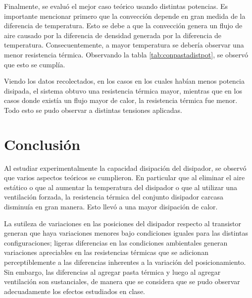 \documentclass{article}
\begin{document}
Finalmente, se evaluó el mejor caso teórico usando distintas potencias. Es importante mencionar primero que la convección depende en gran medida de la diferencia de temperatura. Esto se debe a que la convección genera un flujo de aire causado por la diferencia de densidad generada por la diferencia de temperatura. Consecuentemente, a mayor temperatura se debería observar una menor resistencia térmica. Observando la tabla \ref{tab:conpastadistpot}, se observó que esto se cumplía. \par
Viendo los datos recolectados, en los casos en los cuales habían menos potencia disipada, el sistema obtuvo una resistencia térmica mayor, mientras que en los casos donde existía un flujo mayor de calor, la resistencia térmica fue menor. Todo esto se pudo observar a distintas tensiones aplicadas.

\section{Conclusión}

Al estudiar experimentalmente la capacidad disipación del disipador, se observó que varios aspectos teóricos se cumplieron. En particular que al eliminar el aire estático o que al aumentar la temperatura del disipador o que al utilizar una ventilación forzada, la resistencia térmica del conjunto disipador carcasa disminuía en gran manera. Esto llevó a una mayor disipación de calor.

La sutileza de variaciones en las posiciones del disipador respecto al transistor generan que haya variaciones menores bajo condiciones iguales para las distintas configuraciones; ligeras diferencias en las condiciones ambientales generan variaciones apreciables en las resistencias térmicas que se adicionan perceptiblemente a las diferencias inherentes a la variación del posicionamiento. Sin embargo, las diferencias al agregar pasta térmica y luego al agregar ventilación son sustanciales, de manera que se considera que se pudo observar adecuadamente los efectos estudiados en clase.



\printbibliography
\end{document}
